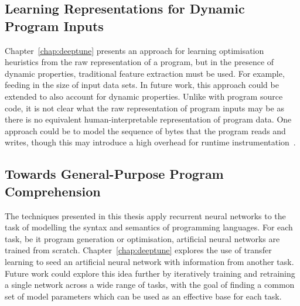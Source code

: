 

\subsection{Learning Representations for Dynamic Program Inputs}

Chapter~\ref{chap:deeptune} presents an approach for learning optimisation heuristics from the raw representation of a program, but in the presence of dynamic properties, traditional feature extraction must be used. For example, feeding in the size of input data sets. In future work, this approach could be extended to also account for dynamic properties. Unlike with program source code, it is not clear what the raw representation of program inputs may be as there is no equivalent human-interpretable representation of program data. One approach could be to model the sequence of bytes that the program reads and writes, though this may introduce a high overhead for runtime instrumentation~\cite{Gad2014}.



\subsection{Towards General-Purpose Program Comprehension}

The techniques presented in this thesis apply recurrent neural networks to the task of modelling the syntax and semantics of programming languages. For each task, be it program generation or optimisation, artificial neural networks are trained from scratch. Chapter~\ref{chap:deeptune} explores the use of transfer learning to seed an artificial neural network with information from another task. Future work could explore this idea further by iteratively training and retraining a single network across a wide range of tasks, with the goal of finding a common set of model parameters which can be used as an effective base for each task.

